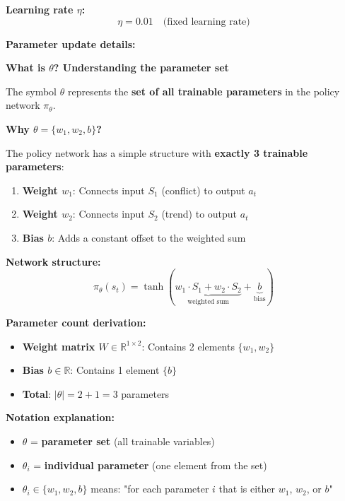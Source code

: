\documentclass[11pt,a4paper]{article}
\begin{document}
\begin{itemize}
\textbf{Learning rate $\eta$:}
\begin{equation}
\eta = 0.01 \quad \text{(fixed learning rate)}
\end{equation}

\textbf{Parameter update details:}

\textbf{What is $\theta$? Understanding the parameter set}

The symbol $\theta$ represents the \textbf{set of all trainable parameters} in the policy network $\pi_\theta$. 

\textbf{Why $\theta = \{w_1, w_2, b\}$?}

The policy network has a simple structure with \textbf{exactly 3 trainable parameters}:

\begin{enumerate}
    \item \textbf{Weight $w_1$}: Connects input $S_1$ (conflict) to output $a_t$
    \item \textbf{Weight $w_2$}: Connects input $S_2$ (trend) to output $a_t$
    \item \textbf{Bias $b$}: Adds a constant offset to the weighted sum
\end{enumerate}

\textbf{Network structure:}
\begin{equation}
\pi_\theta(s_t) = \tanh(\underbrace{w_1 \cdot S_1 + w_2 \cdot S_2}_{\text{weighted sum}} + \underbrace{b}_{\text{bias}})
\end{equation}

\textbf{Parameter count derivation:}
\begin{itemize}
    \item \textbf{Weight matrix $W \in \mathbb{R}^{1 \times 2}$}: Contains 2 elements $\{w_1, w_2\}$
    \item \textbf{Bias $b \in \mathbb{R}$}: Contains 1 element $\{b\}$
    \item \textbf{Total}: $|\theta| = 2 + 1 = 3$ parameters
\end{itemize}

\textbf{Notation explanation:}
\begin{itemize}
    \item $\theta$ = \textbf{parameter set} (all trainable variables)
    \item $\theta_i$ = \textbf{individual parameter} (one element from the set)
    \item $\theta_i \in \{w_1, w_2, b\}$ means: "for each parameter $i$ that is either $w_1$, $w_2$, or $b$"
\end{itemize}


\end{itemize}
\end{document}
